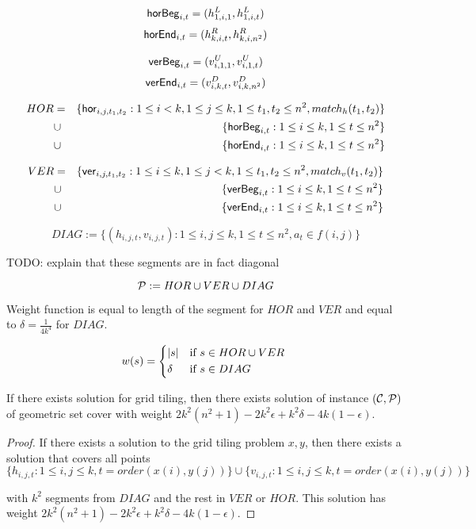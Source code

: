$$\mathsf{horBeg}_{i,t} = (h^L_{1, i, 1}, h^L_{1, i, t})$$
$$\mathsf{horEnd}_{i,t} = (h^R_{k, i, t}, h^R_{k, i, n^2})$$

$$\mathsf{verBeg}_{i,t} = (v^U_{i, 1, 1}, v^U_{i, 1, t})$$
$$\mathsf{verEnd}_{i,t} = (v^D_{i, k, t}, v^D_{i, k, n^2})$$

\begin{eqnarray*}
HOR &= &\{\mathsf{hor}_{i,j,t_1,t_2} : 1 \le i < k, 1 \le j \le k,
1 \le t_1, t_2 \le n^2, match_h(t_1, t_2)\} \\
&\cup &\{\mathsf{horBeg}_{i,t} : 1 \le i \le k, 1 \le t \le n^2\}
\\
&\cup &\{\mathsf{horEnd}_{i,t} : 1 \le i \le k, 1 \le t \le n^2\}
\end{eqnarray*}

\begin{eqnarray*}
VER &= &\{\mathsf{ver}_{i,j,t_1,t_2} : 1 \le i \le k, 1 \le j < k,
1 \le t_1, t_2 \le n^2, match_v(t_1, t_2)\} \\
&\cup &\{\mathsf{verBeg}_{i,t} : 1 \le i \le k, 1 \le t \le n^2\}
\\
&\cup &\{\mathsf{verEnd}_{i,t} : 1 \le i \le k, 1 \le t \le n^2\}
\end{eqnarray*}

$$DIAG := \{ (h_{i, j, t}, v_{i, j, t}) :
	1 \le i, j \le k, 1 \le t \le n^2, a_t \in f(i, j)\}$$

TODO: explain that these segments are in fact diagonal

$$\mathcal{P} := HOR \cup VER \cup DIAG$$

Weight function is equal to length of the segment for $HOR$ and $VER$
and equal to $\delta = \frac{1}{4k^4}$ for $DIAG$.

\begin{equation}
w(s) =
	\begin{cases*}
	  |s| 			& if $s \in HOR \cup VER$ \\
	  \delta        & if $s \in DIAG$
	\end{cases*}
\end{equation}

\newcommand{\solWeight}{2k^2(n^2+1) - 2k^2\epsilon +k^2\delta -4k(1-\epsilon)}

\begin{lemma}
	If there exists solution for grid tiling,
	then there exists solution of instance $(\mathcal{C}, \mathcal{P})$
	of geometric set cover
	with weight $\solWeight$.
\end{lemma}

\begin{proof}
	If there exists a solution to the grid tiling problem
	$x, y$,
	then there exists a solution that covers
	all points
	$$\{h_{i, j, t} : 1 \le i, j \le k, t=order(x(i), y(j))\}
	\cup \{v_{i, j, t} : 1 \le i, j \le k, t=order(x(i), y(j))\}$$
	
	with $k^2$ segments from $DIAG$
	and the rest in $VER$ or $HOR$.
	This solution has weight $\solWeight$.
\end{proof}

